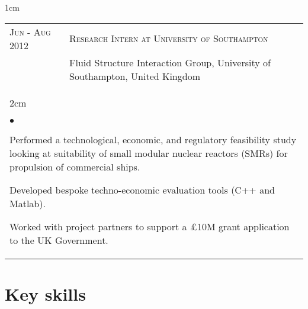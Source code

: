 \documentclass[a4paper,10pt]{article}
\newcommand{\squishlist}{
	\begin{list}{$\bullet$}
	{
		\setlength{\itemsep}{0pt}
		\setlength{\parsep}{0pt}
		\setlength{\topsep}{0pt}
		\setlength{\partopsep}{0pt}
		\setlength{\leftmargin}{2em}
		\setlength{\labelwidth}{1.5em}
		\setlength{\labelsep}{0.5em}
	}
}
\newcommand{\squishend}{\end{list}}
\begin{document}
\begin{minipage}{\textwidth}
\begin{adjustwidth}{}{1cm}
\begin{tabular}{p{3.5cm} p{12.9cm}}
\textsc{Jun - Aug 2012} & \textsc{Research Intern at University of Southampton} \\
						& Fluid Structure Interaction Group, University of Southampton, United Kingdom \vspace{0.1cm} \\
%
\multicolumn{2}{l}{
\hspace{1cm}\begin{minipage}[t]{\textwidth}
\begin{adjustwidth}{}{2cm}
\squishlist
	\item Performed a technological, economic, and regulatory feasibility study looking at suitability of
		small modular nuclear reactors (SMRs) for propulsion of commercial ships.
	\item Developed bespoke techno-economic evaluation tools (C++ and Matlab).
	\item Worked with project partners to support a \pounds10M grant application to the UK Government.
\squishend
\end{adjustwidth}
\end{minipage}
} \\

\end{tabular}

\end{adjustwidth}
\end{minipage}


\section{Key skills}
\end{document}
